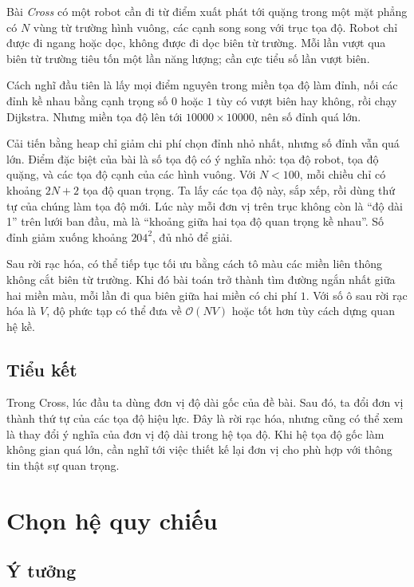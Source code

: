 \documentclass[11pt]{article}
\newcommand{\Oh}{\mathcal{O}}
\begin{document}
Bài \textit{Cross} có một robot cần đi từ điểm xuất phát tới quặng trong một
mặt phẳng có \(N\) vùng từ trường hình vuông, các cạnh song song với trục tọa
độ. Robot chỉ được đi ngang hoặc dọc, không được đi dọc biên từ trường. Mỗi
lần vượt qua biên từ trường tiêu tốn một lần năng lượng; cần cực tiểu số lần
vượt biên.

Cách nghĩ đầu tiên là lấy mọi điểm nguyên trong miền tọa độ làm đỉnh, nối các
đỉnh kề nhau bằng cạnh trọng số \(0\) hoặc \(1\) tùy có vượt biên hay không,
rồi chạy Dijkstra. Nhưng miền tọa độ lên tới \(10000\times10000\), nên số đỉnh
quá lớn.

Cải tiến bằng heap chỉ giảm chi phí chọn đỉnh nhỏ nhất, nhưng số đỉnh vẫn quá
lớn. Điểm đặc biệt của bài là số tọa độ có ý nghĩa nhỏ: tọa độ robot, tọa độ
quặng, và các tọa độ cạnh của các hình vuông. Với \(N<100\), mỗi chiều chỉ có
khoảng \(2N+2\) tọa độ quan trọng. Ta lấy các tọa độ này, sắp xếp, rồi dùng
thứ tự của chúng làm tọa độ mới. Lúc này mỗi đơn vị trên trục không còn là
``độ dài 1'' trên lưới ban đầu, mà là ``khoảng giữa hai tọa độ quan trọng kề
nhau''. Số đỉnh giảm xuống khoảng \(204^2\), đủ nhỏ để giải.

Sau rời rạc hóa, có thể tiếp tục tối ưu bằng cách tô màu các miền liên thông
không cắt biên từ trường. Khi đó bài toán trở thành tìm đường ngắn nhất giữa
hai miền màu, mỗi lần đi qua biên giữa hai miền có chi phí \(1\). Với số ô sau
rời rạc hóa là \(V\), độ phức tạp có thể đưa về \(\Oh(NV)\) hoặc tốt hơn tùy
cách dựng quan hệ kề.

\subsection{Tiểu kết}

Trong Cross, lúc đầu ta dùng đơn vị độ dài gốc của đề bài. Sau đó, ta đổi
đơn vị thành thứ tự của các tọa độ hiệu lực. Đây là rời rạc hóa, nhưng cũng
có thể xem là thay đổi ý nghĩa của đơn vị độ dài trong hệ tọa độ. Khi hệ tọa
độ gốc làm không gian quá lớn, cần nghĩ tới việc thiết kế lại đơn vị cho phù
hợp với thông tin thật sự quan trọng.

\section{Chọn hệ quy chiếu}

\subsection{Ý tưởng}
\end{document}
